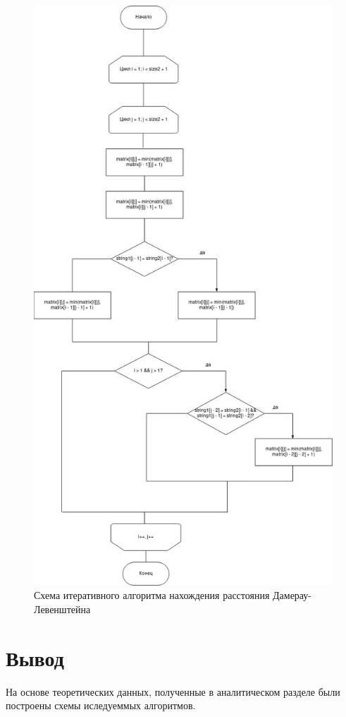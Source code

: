 \documentclass[12pt]{report}
\begin{document}
\begin{figure}[h]
	\centering
	\includegraphics[scale=0.4]{iter_dl.jpg}
	\caption{Схема итеративного алгоритма нахождения расстояния Дамерау-Левенштейна}
	\label{fig:mpr}
\end{figure}

\section{Вывод}
	На основе теоретических данных, полученные в аналитическом разделе были построены схемы иследуеммых  алгоритмов.
\end{document}
